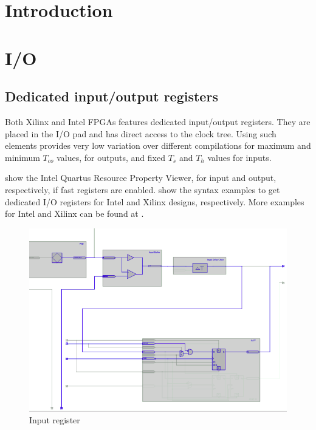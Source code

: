 \section{Introduction}

\section{I/O}

\subsection{Dedicated input/output registers}

Both Xilinx and Intel FPGAs features dedicated input/output registers. They are placed in the I/O pad and has direct access to the clock tree. Using such elements provides very low variation over different compilations for maximum and minimum $T_{co}$ values, for outputs, and fixed $T_s$ and $T_h$ values for inputs.

 show the Intel Quartus Resource Property Viewer, for input and output, respectively, if fast registers are enabled.  show the syntax examples to get dedicated I/O registers for Intel and Xilinx designs, respectively. More examples for Intel and Xilinx can be found at \cite{intel307IntelFPGA2018}.

\begin{figure}[htb]
    \centering
    \includegraphics[width=0.8\linewidth]{images/quartus/fastinputregister-quartus}
    \caption{Input register}
    \label{fig:fastinputregister-quartus}
\end{figure} 

